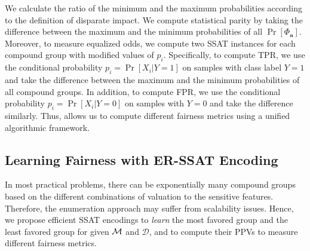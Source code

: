 We calculate the ratio of the minimum and the maximum probabilities according to the definition of disparate impact. 
We compute statistical parity by taking the difference between the maximum and the minimum probabilities of all $ \Pr[\Phi_{\mathbf{a}}] $.
Moreover, to measure equalized odds, we compute two SSAT instances for each compound group with modified values of $ p_i $. 
Specifically, to compute TPR, we use the conditional probability $ p_i = \Pr[X_i|Y=1] $ on samples with class label $ Y = 1 $ and take the difference between the maximum and the minimum probabilities of all compound groups. In addition, to compute FPR, we use the conditional probability $ p_i = \Pr[X_i|Y=0] $ on samples with $ Y = 0 $ and take the difference similarly.
Thus, {\justiciaenum} allows us to compute different fairness metrics using a unified algorithmic framework.


\subsection{Learning Fairness with ER-SSAT Encoding}
\label{fairness_justicia_sec:learn_ssat}
In most practical problems, there can be exponentially many compound groups based on the different combinations of valuation to the sensitive features. 
Therefore, the enumeration approach may suffer from scalability issues. 
Hence, we propose efficient SSAT encodings to \textit{learn} the most favored group and the least favored group for given  $\mathcal{M}$ and $ \mathcal{D} $, and to compute their PPVs to measure different fairness metrics. 

